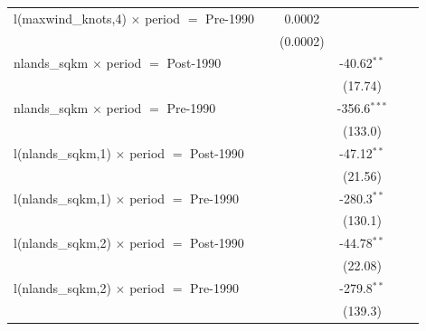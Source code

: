 \begin{tabular}{lccccc}
   l(maxwind\_knots,4) $\times$ period $=$ Pre-1990           &                & 0.0002                  &                &                         &   \\   
                                                              &                & (0.0002)                &                &                         &   \\   
   nlands\_sqkm $\times$ period $=$ Post-1990                 &                &                         & -40.62$^{**}$  &                         &   \\   
                                                              &                &                         & (17.74)        &                         &   \\   
   nlands\_sqkm $\times$ period $=$ Pre-1990                  &                &                         & -356.6$^{***}$ &                         &   \\   
                                                              &                &                         & (133.0)        &                         &   \\   
   l(nlands\_sqkm,1) $\times$ period $=$ Post-1990            &                &                         & -47.12$^{**}$  &                         &   \\   
                                                              &                &                         & (21.56)        &                         &   \\   
   l(nlands\_sqkm,1) $\times$ period $=$ Pre-1990             &                &                         & -280.3$^{**}$  &                         &   \\   
                                                              &                &                         & (130.1)        &                         &   \\   
   l(nlands\_sqkm,2) $\times$ period $=$ Post-1990            &                &                         & -44.78$^{**}$  &                         &   \\   
                                                              &                &                         & (22.08)        &                         &   \\   
   l(nlands\_sqkm,2) $\times$ period $=$ Pre-1990             &                &                         & -279.8$^{**}$  &                         &   \\   
                                                              &                &                         & (139.3)        &                         &   \\   

\end{tabular}
